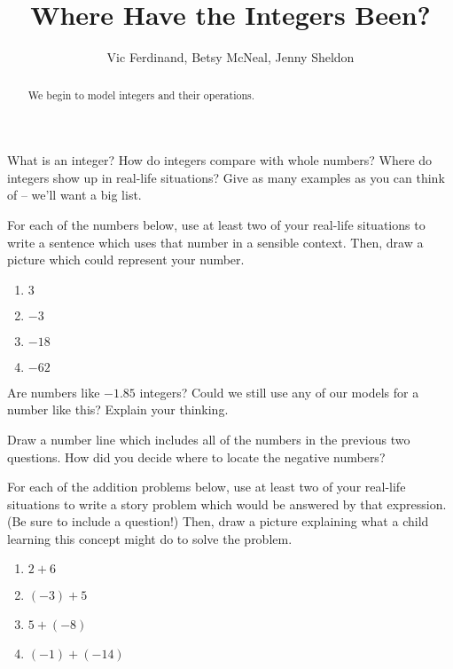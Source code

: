 \documentclass[ nooutcomes,noauthor]{ximera}
\title{Where Have the Integers Been?}
\author{Vic Ferdinand, Betsy McNeal, Jenny Sheldon}
\begin{document}
\begin{abstract}
    We begin to model integers and their operations.
\end{abstract}
\maketitle



\begin{problem}
What is an integer?  How do integers compare with whole numbers?  Where do integers show up in real-life situations?  Give as many examples as you can think of -- we'll want a big list.
\end{problem}

\begin{problem}
For each of the numbers below, use at least two of your real-life situations to write a sentence which uses that number in a sensible context.  Then, draw a picture which could represent your number.
\begin{enumerate}
    \item $3$
    \item $-3$
    \item $-18$
    \item $-62$
\end{enumerate}

\end{problem}

\begin{problem}
	Are numbers like $-1.85$ integers? Could we still use any of our models for a number like this? Explain your thinking.
\end{problem}

\begin{problem}
Draw a number line which includes all of the numbers in the previous two questions.  How did you decide where to locate the negative numbers?
\end{problem}

\begin{problem}
For each of the addition problems below, use at least two of your real-life situations to write a story problem which would be answered by that expression.  (Be sure to include a question!)  Then, draw a picture explaining what a child learning this concept might do to solve the problem.
\begin{enumerate}
    \item $2+6$
    \item $(-3) + 5$
    \item $5 + (-8)$
    \item $(-1) + (-14)$
\end{enumerate}

\end{problem}
\end{document}

